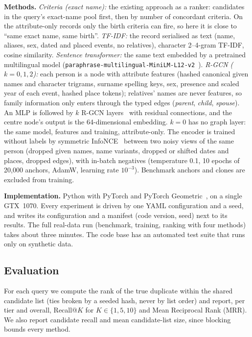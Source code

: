\textbf{Methods.}
\textit{Criteria (exact name):} the existing approach as a ranker: candidates in the query's exact-name pool first, then by number of concordant criteria. On the attribute-only records only the birth criteria can fire, so here it is close to ``same exact name, same birth''.
\textit{TF-IDF:} the record serialised as text (name, aliases, sex, dated and placed events, no relatives), character 2--4-gram TF-IDF, cosine similarity.
\textit{Sentence transformer:} the same text embedded by a pretrained multilingual model (\texttt{paraphrase-multilingual-MiniLM-L12-v2}~\cite{reimers2019sbert}).
\textit{R-GCN ($k=0,1,2$):} each person is a node with attribute features (hashed canonical given names and character trigrams, surname spelling keys, sex, presence and scaled year of each event, hashed place tokens); relatives' names are never features, so family information only enters through the typed edges (\textit{parent}, \textit{child}, \textit{spouse}). An MLP is followed by $k$ R-GCN layers~\cite{schlichtkrull2018rgcn} with residual connections, and the centre node's output is the 64-dimensional embedding. $k=0$ has no graph layer: the same model, features and training, attribute-only. The encoder is trained without labels by symmetric InfoNCE~\cite{chen2020simclr} between two noisy views of the same person (dropped given names, name variants, dropped or shifted dates and places, dropped edges), with in-batch negatives (temperature 0.1, 10 epochs of 20{,}000 anchors, AdamW, learning rate $10^{-3}$). Benchmark anchors and clones are excluded from training.

\textbf{Implementation.}
Python with PyTorch and PyTorch Geometric~\cite{fey2019pyg}, on a single GTX~1070. Every experiment is driven by one YAML configuration and a seed, and writes its configuration and a manifest (code version, seed) next to its results. The full real-data run (benchmark, training, ranking with four methods) takes about three minutes. The code base has an automated test suite that runs only on synthetic data.

\subsection*{Evaluation}
For each query we compute the rank of the true duplicate within the shared candidate list (ties broken by a seeded hash, never by list order) and report, per tier and overall, Recall@$K$ for $K\in\{1,5,10\}$ and Mean Reciprocal Rank (MRR). We also report candidate recall and mean candidate-list size, since blocking bounds every method.

